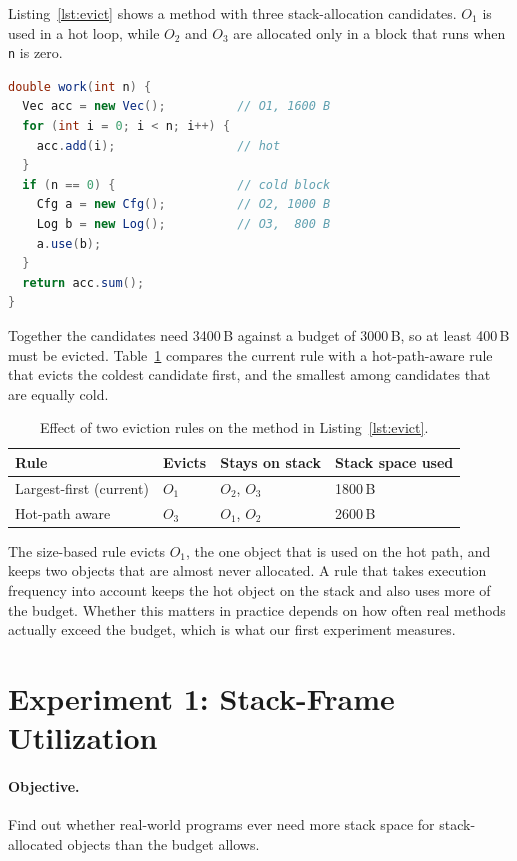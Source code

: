Listing~\ref{lst:evict} shows a method with three stack-allocation candidates. $O_1$ is used in
a hot loop, while $O_2$ and $O_3$ are allocated only in a block that runs when \texttt{n} is
zero.

\begin{lstlisting}[language=Java, caption={A method whose candidates exceed the budget.}, label={lst:evict}]
double work(int n) {
  Vec acc = new Vec();          // O1, 1600 B
  for (int i = 0; i < n; i++) {
    acc.add(i);                 // hot
  }
  if (n == 0) {                 // cold block
    Cfg a = new Cfg();          // O2, 1000 B
    Log b = new Log();          // O3,  800 B
    a.use(b);
  }
  return acc.sum();
}
\end{lstlisting}

Together the candidates need 3400\,B against a budget of 3000\,B, so at least 400\,B must be
evicted. Table~\ref{tab:evict} compares the current rule with a hot-path-aware rule that evicts
the coldest candidate first, and the smallest among candidates that are equally cold.

\begin{table}[htbp]
  \centering
  \begin{tabular}{@{}llll@{}}
    \toprule
    Rule & Evicts & Stays on stack & Stack space used \\
    \midrule
    Largest-first (current) & $O_1$ & $O_2$, $O_3$ & 1800\,B \\
    Hot-path aware          & $O_3$ & $O_1$, $O_2$ & 2600\,B \\
    \bottomrule
  \end{tabular}
  \caption{Effect of two eviction rules on the method in Listing~\ref{lst:evict}.}
  \label{tab:evict}
\end{table}

The size-based rule evicts $O_1$, the one object that is used on the hot path, and keeps two
objects that are almost never allocated. A rule that takes execution frequency into account keeps
the hot object on the stack and also uses more of the budget. Whether this matters in practice
depends on how often real methods actually exceed the budget, which is what our first experiment
measures.

\section{Experiment 1: Stack-Frame Utilization}

\paragraph{Objective.} Find out whether real-world programs ever need more stack space for
stack-allocated objects than the budget allows.

